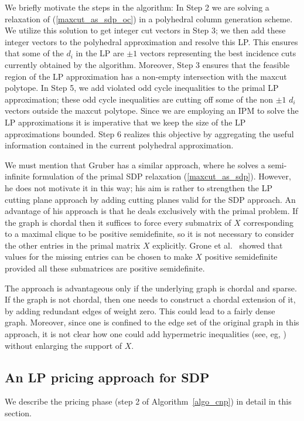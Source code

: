 \documentclass[12pt]{article}
\begin{document}
We briefly motivate the steps in the algorithm: In Step 2 we are
solving a relaxation of (\ref{maxcut_as_sdp_oc}) in a polyhedral
column generation scheme. We utilize this solution to get integer
cut vectors in Step 3; we then add these integer vectors to the
polyhedral approximation and resolve this LP. This ensures that
some of the $d_i$ in the LP are $\pm 1$ vectors representing the
best incidence cuts currently obtained by the algorithm. Moreover,
Step 3 ensures that the feasible region of the LP approximation
has a non-empty intersection with the maxcut polytope.  In Step 5,
we add violated odd cycle inequalities to the primal LP
approximation; these odd cycle inequalities are cutting off some
of the non $\pm 1$ $d_i$ vectors outside the maxcut polytope.
Since we are employing an IPM to solve the LP approximations it is
imperative that we keep the size of the LP approximations bounded.
Step 6 realizes this objective by aggregating the useful
information contained in the current polyhedral approximation.

We must mention that Gruber \cite{gruber3} has a similar approach,
where he solves a semi-infinite formulation of the primal SDP
relaxation (\ref{maxcut_as_sdp}). However, he does not motivate it
in this way; his aim is rather to strengthen the LP cutting plane
approach by adding cutting planes valid for the SDP approach. An
advantage of his approach is that he deals exclusively with the
primal problem. If the graph is chordal then it suffices to force
every submatrix of $X$ corresponding to a maximal clique to be
positive semidefinite, so it is not necessary to consider the
other entries in the primal matrix $X$ explicitly. Grone et
al.~\cite{grone1} showed that values for the missing entries can
be chosen to make $X$ positive semidefinite provided all these
submatrices are positive semidefinite.

The approach is advantageous only if the underlying graph is
chordal and sparse. If the graph is not chordal, then one needs to
construct a chordal extension of it, by adding redundant edges of
weight zero. This could lead to a fairly dense graph. Moreover,
since one is confined to the edge set of the original graph in
this approach, it is not clear how one could add hypermetric
inequalities (see, eg, \cite{deza_laurent}) without enlarging the
support of $X$.

\subsection{An LP pricing approach for SDP}
\label{pricing_phase} We describe the pricing phase (step 2 of
Algorithm~\ref{algo_cnp}) in detail in this section.
\end{document}
